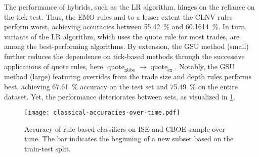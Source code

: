 The performance of hybrids, such as the \gls{LR} algorithm, hinges on the reliance on the tick test. Thus, the \gls{EMO} rules and to a lesser extent the \gls{CLNV} rules perform worst, achieving accuracies between \SI{55.42}{\percent} and \SI{60.1614}{\percent}. In turn, variants of the \gls{LR} algorithm, which uses the quote rule for most trades, are among the best-performing algorithms. By extension, the \gls{GSU} method (small) further reduces the dependence on tick-based methods through the successive applications of quote rules, here $\operatorname{quote}_{\mathrm{nbbo}} \to \operatorname{quote}_{\mathrm{ex}}$. Notably, the \gls{GSU} method (large) featuring overrides from the trade size and depth rules performs best, achieving \SI{67.61}{\percent} accuracy on the test set and \SI{75.49}{\percent} on the entire dataset. Yet, the performance deteriorates between sets, as visualized in \cref{fig:classical-accuracies-over-time}.

\begin{figure}[ht]
    \centering
    \texttt{[image: classical-accuracies-over-time.pdf]}
    \caption[Accuracy of Rule-Based Classifiers Over Time]{Accuracy of rule-based classifiers on \gls{ISE} and \gls{CBOE} sample over time. The bar \myline{} indicates the beginning of a new subset based on the train-test split.}
    \label{fig:classical-accuracies-over-time}
\end{figure}

